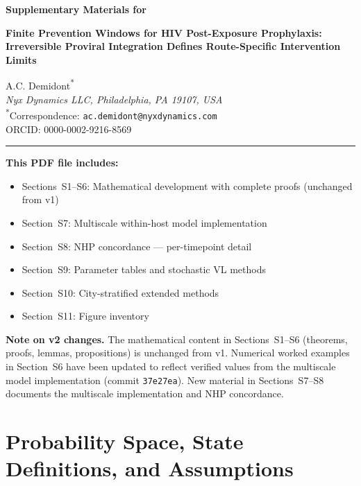 \documentclass[11pt]{article}
\theoremstyle{definition}
\theoremstyle{remark}
\begin{document}
\begin{flushleft}
{\Large\bfseries Supplementary Materials for\par}
\vspace{0.3em}
{\large\bfseries Finite Prevention Windows for HIV Post-Exposure Prophylaxis: Irreversible Proviral Integration Defines Route-Specific Intervention Limits\par}
\vspace{0.8em}
A.C. Demidont\textsuperscript{*}\\
\textit{Nyx Dynamics LLC, Philadelphia, PA 19107, USA}\\
\textsuperscript{*}Correspondence: \texttt{ac.demidont@nyxdynamics.com}\\
ORCID: 0000-0002-9216-8569
\end{flushleft}

\vspace{0.5em}
\hrule
\vspace{0.5em}

\noindent\textbf{This PDF file includes:}
\begin{itemize}[leftmargin=2em,nosep]
    \item Sections~S1--S6: Mathematical development with complete proofs (unchanged from v1)
    \item Section~S7: Multiscale within-host model implementation
    \item Section~S8: NHP concordance --- per-timepoint detail
    \item Section~S9: Parameter tables and stochastic VL methods
    \item Section~S10: City-stratified extended methods
    \item Section~S11: Figure inventory
\end{itemize}

\vspace{0.5em}
\noindent\textbf{Note on v2 changes.} The mathematical content in Sections~S1--S6 (theorems, proofs, lemmas, propositions) is unchanged from v1. Numerical worked examples in Section~S6 have been updated to reflect verified values from the multiscale model implementation (commit \texttt{37e27ea}). New material in Sections~S7--S8 documents the multiscale implementation and NHP concordance.

\section{Probability Space, State Definitions, and Assumptions}
\end{document}
